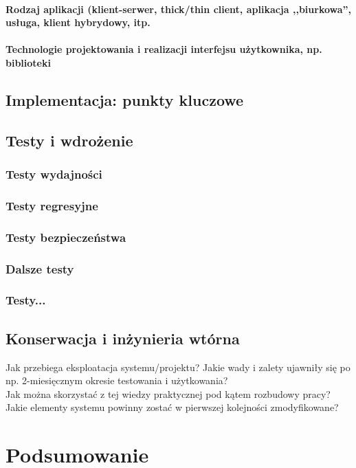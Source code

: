 \documentclass[12pt]{report}
\begin{document}
\subsubsection{Rodzaj aplikacji (klient-serwer, thick/thin client, aplikacja
,,biurkowa'', usługa, klient hybrydowy, itp.}
\subsubsection{Technologie projektowania i realizacji interfejsu użytkownika,
np. biblioteki}


\section{Implementacja: punkty kluczowe}

\section{Testy i wdrożenie}
\subsection{Testy wydajności}
\subsection{Testy regresyjne}
\subsection{Testy bezpieczeństwa}
\subsection{Dalsze testy}
\subsection{Testy...}

\section{Konserwacja i inżynieria wtórna}
Jak przebiega eksploatacja systemu/projektu? Jakie wady i zalety ujawniły się po
np. 2-miesięcznym okresie testowania i użytkowania? \\
\indent Jak można skorzystać z tej wiedzy praktycznej pod kątem roz\-bu\-do\-wy pracy? Jakie elementy systemu powinny zostać w pierwszej kolejności zmodyfikowane?  

\chapter{Podsumowanie}
\end{document}
